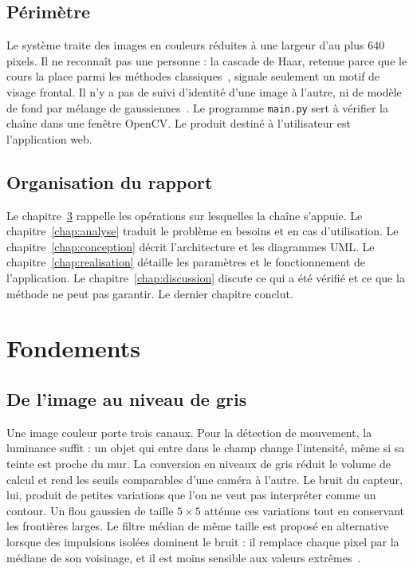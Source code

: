 \section{Périmètre}

Le système traite des images en couleurs réduites à une largeur d'au plus 640 pixels. Il ne reconnaît pas une personne : la cascade de Haar, retenue parce que le cours la place parmi les méthodes classiques~\cite{viola}, signale seulement un motif de visage frontal. Il n'y a pas de suivi d'identité d'une image à l'autre, ni de modèle de fond par mélange de gaussiennes~\cite{piccardi}. Le programme \texttt{main.py} sert à vérifier la chaîne dans une fenêtre OpenCV. Le produit destiné à l'utilisateur est l'application web.

\section{Organisation du rapport}

Le chapitre~\ref{chap:fondements} rappelle les opérations sur lesquelles la chaîne s'appuie. Le chapitre~\ref{chap:analyse} traduit le problème en besoins et en cas d'utilisation. Le chapitre~\ref{chap:conception} décrit l'architecture et les diagrammes UML. Le chapitre~\ref{chap:realisation} détaille les paramètres et le fonctionnement de l'application. Le chapitre~\ref{chap:discussion} discute ce qui a été vérifié et ce que la méthode ne peut pas garantir. Le dernier chapitre conclut.

\chapter{Fondements}
\label{chap:fondements}

\section{De l'image au niveau de gris}

Une image couleur porte trois canaux. Pour la détection de mouvement, la luminance suffit : un objet qui entre dans le champ change l'intensité, même si sa teinte est proche du mur. La conversion en niveaux de gris réduit le volume de calcul et rend les seuils comparables d'une caméra à l'autre. Le bruit du capteur, lui, produit de petites variations que l'on ne veut pas interpréter comme un contour. Un flou gaussien de taille $5\times 5$ atténue ces variations tout en conservant les frontières larges. Le filtre médian de même taille est proposé en alternative lorsque des impulsions isolées dominent le bruit : il remplace chaque pixel par la médiane de son voisinage, et il est moins sensible aux valeurs extrêmes~\cite{gonzalez}.

